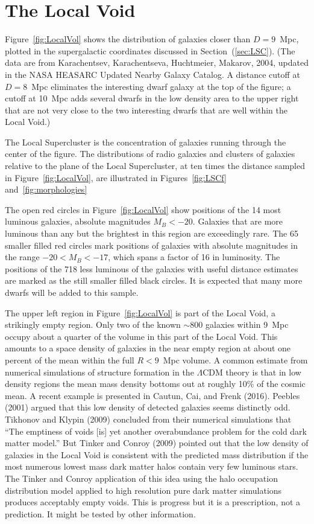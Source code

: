 \documentclass[fleqn,usenatbib]{mnras}
\begin{document}
\section{The Local Void}\label{sec:localvoid} 

Figure~\ref{fig:LocalVol} shows the distribution of galaxies closer than $D=9$~Mpc, plotted in the supergalactic coordinates discussed in Section~(\ref{sec:LSC}). (The data are from Karachentsev, Karachentseva, Huchtmeier, Makarov, 2004, updated in the NASA HEASARC Updated Nearby Galaxy Catalog. A distance cutoff at $D=8$~Mpc eliminates the interesting dwarf galaxy at the top of the figure; a cutoff at 10~Mpc adds several dwarfs in the low density area to the upper right that are not very close to the two interesting dwarfs that are well within the Local Void.) 

The Local Supercluster is the  concentration of galaxies running through the center of the figure. The distributions of radio galaxies and clusters of galaxies relative to the plane of the Local Supercluster, at ten times the distance sampled in Figure~\ref{fig:LocalVol}, are illustrated in Figures~\ref{fig:LSCf} and~\ref{fig:morphologies}

The open red circles in Figure~\ref{fig:LocalVol} show positions of the 14 most luminous galaxies, absolute magnitudes $M_B<-20$. Galaxies that are more luminous than any but the brightest in this region are exceedingly rare. The 65 smaller filled red circles mark positions of galaxies with absolute magnitudes in the range $-20 < M_B < -17$, which spans a factor of 16 in luminosity. The positions of the 718 less luminous of the galaxies with useful distance estimates are marked as the still smaller filled black circles. It is expected that many more dwarfs will be added to this sample.

The upper left region in Figure~\ref{fig:LocalVol} is part of the Local Void, a strikingly empty region. Only two of the known $\sim 800$ galaxies within 9~Mpc occupy about a quarter of the volume in this part of the Local Void. This amounts to a space density of galaxies in the near empty region at about one percent of the mean within the full $R<9$~Mpc volume. A common estimate from numerical simulations of structure formation in the $\Lambda$CDM theory is that in low density regions the mean mass density bottoms out at roughly 10\% of the cosmic mean. A recent example is presented in Cautun, Cai, and Frenk (2016). Peebles (2001) argued that this low density of detected galaxies seems distinctly odd. Tikhonov and Klypin (2009) concluded from their numerical simulations that  ``The emptiness of voids [is] yet another overabundance problem for the cold dark matter model.'' But Tinker and Conroy (2009) pointed out that the low density of galaxies in the Local Void is consistent with the predicted mass distribution if the most numerous lowest mass dark matter halos contain very few luminous stars. The Tinker and Conroy application of this idea using the halo occupation distribution model applied to high resolution pure dark matter simulations produces acceptably empty voids. This is progress but it is a prescription, not a prediction. It might be tested by other information. 
\end{document}
